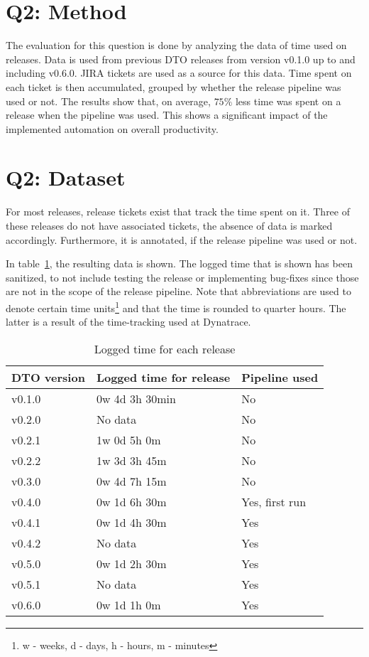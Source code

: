 \section{Q2: Method}\label{sec:q2:-method}

The evaluation for this question is done by analyzing the data of time used on releases.
Data is used from previous DTO releases from version v0.1.0 up to and including v0.6.0.
JIRA tickets are used as a source for this data.
Time spent on each ticket is then accumulated, grouped by whether the release pipeline was used or not.
The results show that, on average, $75 \%$ less time was spent on a release when the pipeline was used.
This shows a significant impact of the implemented automation on overall productivity.

\section{Q2: Dataset}\label{sec:q2:-dataset}

For most releases, release tickets exist that track the time spent on it.
Three of these releases do not have associated tickets, the absence of data is marked accordingly.
Furthermore, it is annotated, if the release pipeline was used or not.

In table~\ref{tab:logged-time-for-each-release}, the resulting data is shown.
The logged time that is shown has been sanitized, to not include testing the release or implementing bug-fixes since those are not in the scope of the release pipeline.
Note that abbreviations are used to denote certain time units\footnote{w - weeks, d - days, h - hours, m - minutes} and that the time is rounded to quarter hours.
The latter is a result of the time-tracking used at Dynatrace.

\begin{table}[H]
    \centering
    \caption{Logged time for each release}
    \label{tab:logged-time-for-each-release}
    \begin{tabular}{l|l|l}
        DTO version & Logged time for release & Pipeline used \\
        \hline
        v0.1.0 & 0w 4d 3h 30min & No \\
        v0.2.0 & No data & No \\
        v0.2.1 & 1w 0d 5h 0m & No \\
        v0.2.2 & 1w 3d 3h 45m & No \\
        v0.3.0 & 0w 4d 7h 15m & No \\
        v0.4.0 & 0w 1d 6h 30m & Yes, first run \\
        v0.4.1 & 0w 1d 4h 30m & Yes \\
        v0.4.2 & No data & Yes \\
        v0.5.0 & 0w 1d 2h 30m & Yes \\
        v0.5.1 & No data & Yes \\
        v0.6.0 & 0w 1d 1h 0m & Yes \\
    \end{tabular}
\end{table}

